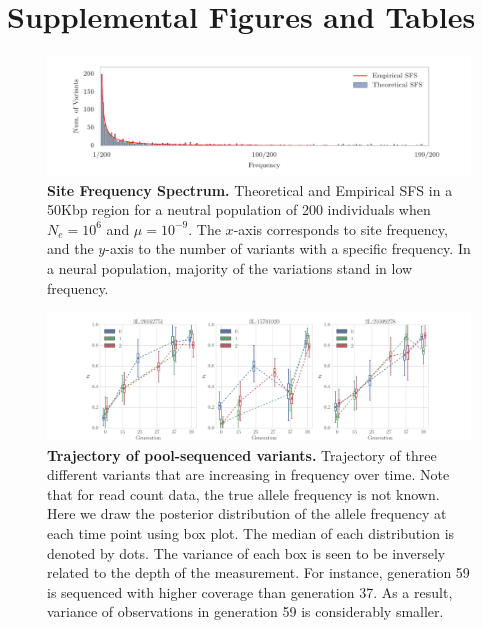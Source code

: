 \section{Supplemental Figures and Tables}

\begin{figure}[H]
	\centering
	\includegraphics[trim=.01in 0.1in .01in 
	0.1in,clip,width=\textwidth]{figures/sfs.pdf}
	\caption{{\bf Site Frequency Spectrum.} Theoretical and
          Empirical SFS in a 50Kbp region for a neutral population of 200
          individuals when $N_e=10^6$ and $\mu=10^{-9}$. The $x$-axis 
          corresponds to site frequency, and
          the $y$-axis to the number of variants with a specific
          frequency. 
          In a neural population, majority of the variations stand in low 
          frequency.} \label{fig:sfs}
\end{figure}



\begin{figure}[H]
	\centering
	\includegraphics[width=\textwidth]{figures/trajectoryReal.pdf}
	\caption{{\bf Trajectory of pool-sequenced variants.}
          Trajectory of three different variants that are increasing
          in frequency over time. Note that for read count data, the
          true allele frequency is not known. Here we draw the
          posterior distribution of the allele frequency at each time
          point using box plot. The median of each distribution is
          denoted by dots. The variance of each box is seen to be
          inversely related to the depth of the measurement. For instance, 
          generation 59 is sequenced with higher coverage than generation 37. 
          As a result, variance of observations in generation 59 is 
          considerably 
          smaller.}
	\label{fig:trajectoryReal}
\end{figure}

